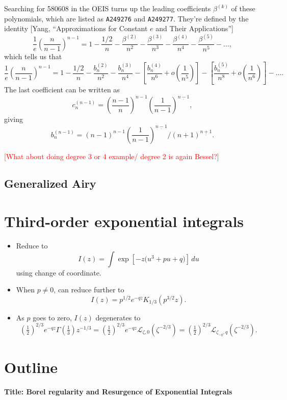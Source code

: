 \documentclass{article}
\newcommand{\laplace}{\mathcal{L}}
\begin{document}
Searching for 580608 in the OEIS turns up the leading coefficients $\beta^{(k)}$ of these polynomials, which are listed as {\tt A249276} and {\tt A249277}. They're defined by the identity [Yang, ``Approximations for Constant $e$ and Their Applications'']
\[ \frac{1}{e} \left(\frac{n}{n-1}\right)^{n-1} = 1 - \frac{1/2}{n} - \frac{\beta^{(2)}}{n^2} - \frac{\beta^{(3)}}{n^3} - \frac{\beta^{(4)}}{n^4} - \frac{\beta^{(5)}}{n^5} - \ldots, \]
which tells us that
\[ \frac{1}{e} \left(\frac{n}{n-1}\right)^{n-1} = 1 - \frac{1/2}{n} - \frac{b_n^{(2)}}{n^2} - \frac{b_n^{(3)}}{n^4} - \left[\frac{b_n^{(4)}}{n^6} + o\left(\frac{1}{n^5}\right)\right] - \left[\frac{b_n^{(5)}}{n^8} + o\left(\frac{1}{n^6}\right)\right] - \ldots. \]
The last coefficient can be written as
\[ c_n^{(n-1)} = \left(\frac{n-1}{n}\right)^{n-1} \left(\frac{1}{n-1}\right)^{\underline{n-1}}, \]
giving
\[ b_n^{(n-1)} = (n-1)^{n-1} \left(\frac{1}{n-1}\right)^{\underline{n-1}} \Big/ (n+1)^{\underline{n+1}}. \]
\color{black}

\textcolor{red}{[What about doing degree 3 or 4 example/ degree 2 is again Bessel?]}

\subsection{Generalized Airy}

\section{Third-order exponential integrals}
\begin{itemize}
\item Reduce to
\[ I(z) = \int \exp\left[-z\big(u^3 + pu + q)\right]\,du \]
using change of coordinate.
\item When $p \neq 0$, can reduce further to
\[ I(z) = p^{1/2} e^{-qz} K_{1/3}(p^{3/2} z). \]
\item As $p$ goes to zero, $I(z)$ degenerates to
\[ \left(\tfrac{1}{2}\right)^{2/3} e^{-qz} \Gamma(\tfrac{1}{3}) z^{-1/3} = \left(\tfrac{1}{2}\right)^{2/3} e^{-qz} \laplace_{\zeta,0}(\zeta^{-2/3}) = \left(\tfrac{1}{2}\right)^{2/3} \laplace_{\zeta_{-q},q}(\zeta^{-2/3}). \]
\end{itemize}


\color{orange}
\section*{Outline}

\textbf{Title: Borel regularity and Resurgence of Exponential Integrals}
\end{document}
